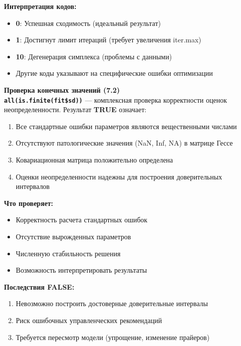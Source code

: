 \documentclass[
  letterpaper,
  DIV=11,
  numbers=noendperiod]{scrreprt}
\begin{document}
\textbf{Интерпретация кодов:}

\begin{itemize}
\item
  \textbf{0}: Успешная сходимость (идеальный результат)
\item
  \textbf{1}: Достигнут лимит итераций (требует увеличения iter.max)
\item
  \textbf{10}: Дегенерация симплекса (проблемы с данными)
\item
  Другие коды указывают на специфические ошибки оптимизации
\end{itemize}

\textbf{Проверка конечных значений (7.2)}\\
\textbf{\texttt{all(is.finite(fit\$sd))}} --- комплексная проверка
корректности оценок неопределенности. Результат \textbf{TRUE} означает:

\begin{enumerate}
\def\labelenumi{\arabic{enumi}.}
\item
  Все стандартные ошибки параметров являются вещественными числами
\item
  Отсутствуют патологические значения (NaN, Inf, NA) в матрице Гессе
\item
  Ковариационная матрица положительно определена
\item
  Оценки неопределенности надежны для построения доверительных
  интервалов
\end{enumerate}

\textbf{Что проверяет:}

\begin{itemize}
\item
  Корректность расчета стандартных ошибок
\item
  Отсутствие вырожденных параметров
\item
  Численную стабильность решения
\item
  Возможность интерпретировать результаты
\end{itemize}

\textbf{Последствия FALSE:}

\begin{enumerate}
\def\labelenumi{\arabic{enumi}.}
\item
  Невозможно построить достоверные доверительные интервалы
\item
  Риск ошибочных управленческих рекомендаций
\item
  Требуется пересмотр модели (упрощение, изменение прайеров)
\end{enumerate}
\end{document}
